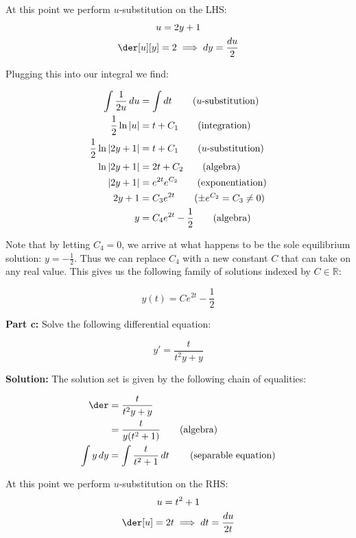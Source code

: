 \documentclass{article}
\begin{document}
At this point we perform $u$-substitution on the LHS:
\begin{gather*}
    u=2y+1\\
    \der[u][y]=2\implies dy=\frac{du}{2}
\end{gather*}

Plugging this into our integral we find:

\begin{align*}
    \int \frac{1}{2u}\mathop{du}&=\int\mathop{dt}\tag{$u$-substitution}\\
    \frac{1}{2}\ln{|u|}&=t+C_1\tag{integration}\\
    \frac{1}{2}\ln{|2y+1|}&=t+C_1\tag{$u$-substitution}\\
    \ln{|2y+1|}&=2t+C_2\tag{algebra}\\
    |2y+1|&=e^{2t}e^{C_2}\tag{exponentiation}\\
    2y+1&=C_3e^{2t}\tag{$\pm e^{C_2}=C_3\not=0$}\\
    y&=C_4e^{2t}-\frac{1}{2}\tag{algebra}
\end{align*}

Note that by letting $C_4=0$, we arrive at what happens to be the sole equilibrium solution: $y=-\frac{1}{2}$. Thus we can replace $C_4$ with a new constant $C$ that can take on any real value. This gives us the following family of solutions indexed by $C\in\mathbb R$:

\begin{equation*}
    y(t)=Ce^{2t}-\frac{1}{2}
\end{equation*}
\smallskip

\noindent\textbf{Part c:} Solve the following differential equation:

\begin{equation*}
    y'=\frac{t}{t^2y+y}
\end{equation*}
\smallskip

\noindent\textbf{Solution:} The solution set is given by the following chain of equalities:

\begin{align*}
    \der&=\frac{t}{t^2y+y}\\
    &=\frac{t}{y(t^2+1)}\tag{algebra}\\
    \int y\mathop{dy}&=\int \frac{t}{t^2+1}\mathop{dt}\tag{separable equation}\\
\end{align*}

At this point we perform $u$-substitution on the RHS:
\begin{gather*}
    u=t^2+1\\
    \der[u]=2t\implies dt=\frac{du}{2t}
\end{gather*}
\end{document}
